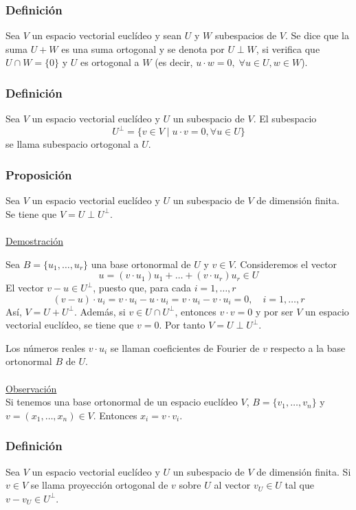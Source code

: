 \documentclass[12pt, a4paper, ones, notitlepage, openany,titlepage]{article}
\newcommand{\demostracion}{\noindent\underline{Demostración}}
\begin{document}
\subsubsection{Definición}
Sea $V$ un espacio vectorial euclídeo y sean $U$ y $W$ subespacios de $V$. Se dice que la suma $U+W$ es una suma ortogonal y se denota por $U \perp W$, si verifica que $U \cap W=\{0\}$ y $U$ es ortogonal a $W$ (es decir, $u \cdot w = 0, \; \forall u \in U, w\in W$).

\subsubsection{Definición}
Sea $V$ un espacio vectorial euclídeo y $U$ un subespacio de $V$. El subespacio
$$
U^{\perp}=\{v \in V \mid u \cdot v=0, \forall u \in U\}
$$
se llama subespacio ortogonal a $U$.

\subsubsection{Proposición}
Sea $V$ un espacio vectorial euclídeo y $U$ un subespacio de $V$ de dimensión finita. Se tiene que $V=U \perp U^{\perp}$.\\\\
\demostracion

Sea $B=\{u_{1}, \ldots, u_{r}\}$ una base ortonormal de $U$ y $v \in V$. Consideremos el vector
$$
u=\left(v \cdot u_{1}\right) u_{1}+\ldots+\left(v \cdot u_{r}\right) u_{r} \in U
$$
El vector $v-u \in U^{\perp}$, puesto que, para cada $i=1, \ldots, r$
$$
(v-u) \cdot u_{i}=v \cdot u_{i}-u \cdot u_{i}=v \cdot u_{i}-v \cdot u_{i}=0, \quad i=1, \ldots, r
$$
Así, $V=U+U^{\perp}$. Además, si $v \in U \cap U^{\perp}$, entonces $v \cdot v=0$ y por ser $V$ un espacio vectorial euclídeo, se tiene que $v=0$. Por tanto $V=U \perp U^{\perp}$.

Los números reales $v \cdot u_{i}$ se llaman coeficientes de Fourier de $v$ respecto a la base ortonormal $B$ de $U$.\\\\
\underline{Observación}\\
Si tenemos una base ortonormal de un espacio euclídeo $V$, $B = \{v_1,\ldots,v_n\}$ y $v = (x_1,\ldots,x_n)\in V$. Entonces $x_i = v \cdot v_i$.

\subsubsection{Definición} Sea $V$ un espacio vectorial euclídeo y $U$ un subespacio de $V$ de dimensión finita. Si $v \in V$ se llama proyección ortogonal de $v$ sobre $U$ al vector $v_{U} \in U$ tal que $v-v_{U} \in U^{\perp}$.
\end{document}
